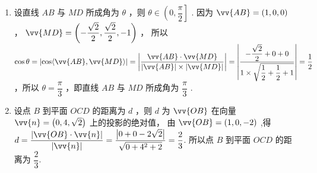 \begin{enumerate}
\begin{jieda}
\begin{enumerate}
            \item 设直线 ${AB}$ 与 ${MD}$ 所成角为 $\theta$ ，则 $\theta  \in  \left( {0,\dfrac{\pi }{2}}\right\rbrack$ . 因为 $\vv{AB} = \left( {1,0,0}\right)$ ， $\vv{MD} = \left( {-\dfrac{\sqrt{2}}{2},\dfrac{\sqrt{2}}{2}, - 1}\right)$ ， 所以 $\cos \theta  = \left| {\cos \langle \vv{AB},\vv{MD}\rangle }\right|  = \left| \dfrac{\vv{AB} \cdot  \vv{MD}}{\left| \vv{AB}\right|  \times  \left| \vv{MD}\right| }\right|  = \left| \dfrac{-\dfrac{\sqrt{2}}{2} + 0 + 0}{1 \times  \sqrt{\dfrac{1}{2} + \dfrac{1}{2} + 1}}\right|  = \dfrac{1}{2}$ ，所以 $\theta  = \dfrac{\pi }{3}$ ，即直线 ${AB}$ 与 ${MD}$ 所成角为 $\dfrac{\pi }{3}$ .

            \item 设点 $B$ 到平面 ${OCD}$ 的距离为 $d$ ，则 $d$ 为 $\vv{OB}$ 在向量 $\vv{n} = \left( {0,4,\sqrt{2}}\right)$ 上的投影的绝对值， 由 $\vv{OB} = \left( {1,0, - 2}\right)$ ,得 $d = \dfrac{\left| \vv{OB} \cdot  \vv{n}\right| }{\left| \vv{n}\right| } = \dfrac{\left| 0 + 0 - 2\sqrt{2}\right| }{\sqrt{0 + {4}^{2} + 2}} = \dfrac{2}{3}$. 所以点 $B$ 到平面 ${OCD}$ 的距离为 $\dfrac{2}{3}$.
        \end{enumerate}
    \end{jieda}
\end{enumerate}
